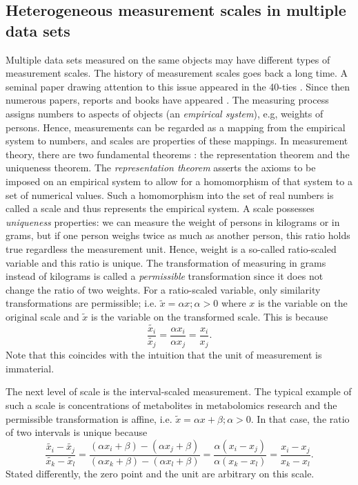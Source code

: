 \subsection{Heterogeneous measurement scales in multiple data sets}
Multiple data sets measured on the same objects may have different types of measurement scales. The history of measurement scales goes back a long time. A seminal paper drawing attention to this issue appeared in the 40-ties \cite{Stevens1946}. Since then numerous papers, reports and books have appeared \cite{Suppes1962,Krantz1971,Narens1981,Narens1986,Luce1987,Hand1996}. The measuring process assigns numbers to aspects of objects (an \textit{empirical system}), e.g, weights of persons. Hence, measurements can be regarded as a mapping from the empirical system to numbers, and scales are properties of these mappings. In measurement theory, there are two fundamental theorems \cite{Krantz1971}: the representation theorem and the uniqueness theorem. The \textit{representation theorem} asserts the axioms to be imposed on an empirical system to allow for a homomorphism of that system to a set of numerical values. Such a homomorphism into the set of real numbers is called a scale and thus represents the empirical system. A scale possesses \textit{uniqueness} properties: we can measure the weight of persons in kilograms or in grams, but if one person weighs twice as much as another person, this ratio holds true regardless the measurement unit. Hence, weight is a so-called ratio-scaled variable and this ratio is unique. The transformation of measuring in grams instead of kilograms is called a \textit{permissible} transformation since it does not change the ratio of two weights. For a ratio-scaled variable, only similarity transformations are permissible; i.e. $\widetilde{x}=\alpha x; \alpha>0$ where $x$ is the variable on the original scale and $\widetilde{x}$ is the variable on the transformed scale. This is because
\begin{equation*}\label{eRatio}
 \frac{\widetilde{x_i}}{\widetilde{x_j}}=\frac{\alpha x_i}{\alpha x_j}=\frac{x_i}{x_j}.
\end{equation*}
Note that this coincides with the intuition that the unit of measurement is immaterial.

The next level of scale is the interval-scaled measurement. The typical example of such a scale is concentrations of metabolites in metabolomics research and the permissible transformation is affine, i.e. $\widetilde{x}=\alpha x +\beta; \alpha>0$. In that case, the ratio of two intervals is unique because
\begin{equation*}\label{eInterval}
 \frac{\widetilde{x_i}-\widetilde{x_j}}{\widetilde{x_k}-\widetilde{x_l}}=\frac{(\alpha x_i + \beta)-(\alpha x_j + \beta)}{(\alpha x_k + \beta)-(\alpha x_l + \beta)}=\frac{\alpha (x_i-x_j)}{\alpha (x_k-x_l)}=\frac{x_i-x_j}{x_k-x_l}.
\end{equation*}
Stated differently, the zero point and the unit are arbitrary on this scale.

